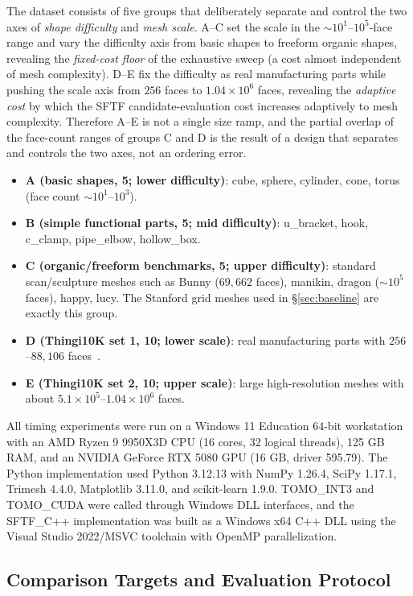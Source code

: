 \documentclass[11pt,a4paper]{article}
\begin{document}
The dataset consists of five groups that deliberately separate and control the two axes of \emph{shape difficulty} and \emph{mesh scale}.
A--C set the scale in the $\sim$$10^1$--$10^5$-face range and vary the difficulty axis from basic shapes to freeform organic shapes,
revealing the \emph{fixed-cost floor} of the exhaustive sweep (a cost almost independent of mesh complexity).
D--E fix the difficulty as real manufacturing parts while pushing the scale axis from $256$ faces to $1.04\times10^6$ faces,
revealing the \emph{adaptive cost} by which the SFTF candidate-evaluation cost increases adaptively to mesh complexity.
Therefore A--E is not a single size ramp, and the partial overlap of the face-count ranges of groups C and D
is the result of a design that separates and controls the two axes, not an ordering error.
\begin{itemize}
\item \textbf{A (basic shapes, 5; lower difficulty)}: cube, sphere, cylinder, cone, torus (face count $\sim$$10^1$--$10^3$).
\item \textbf{B (simple functional parts, 5; mid difficulty)}: u\_bracket, hook, c\_clamp, pipe\_elbow, hollow\_box.
\item \textbf{C (organic/freeform benchmarks, 5; upper difficulty)}: standard scan/sculpture meshes such as Bunny ($69{,}662$ faces), manikin, dragon ($\sim$$10^5$ faces), happy, lucy. The Stanford grid meshes used in \S\ref{sec:baseline} are exactly this group.
\item \textbf{D (Thingi10K set 1, 10; lower scale)}: real manufacturing parts with $256$--$88{,}106$ faces~\cite{Thingi10K}.
\item \textbf{E (Thingi10K set 2, 10; upper scale)}: large high-resolution meshes with about $5.1\times10^5$--$1.04\times10^6$ faces.
\end{itemize}
All timing experiments were run on a Windows 11 Education 64-bit workstation with an AMD Ryzen 9 9950X3D CPU
(16 cores, 32 logical threads), 125 GB RAM, and an NVIDIA GeForce RTX 5080 GPU (16 GB, driver 595.79).
The Python implementation used Python 3.12.13 with NumPy 1.26.4, SciPy 1.17.1, Trimesh 4.4.0, Matplotlib 3.11.0, and scikit-learn 1.9.0.
TOMO\_INT3 and TOMO\_CUDA were called through Windows DLL interfaces, and the SFTF\_C++ implementation was built as a Windows x64 C++ DLL
using the Visual Studio 2022/MSVC toolchain with OpenMP parallelization.

\subsection{Comparison Targets and Evaluation Protocol}
\label{sec:protocol}
\end{document}
